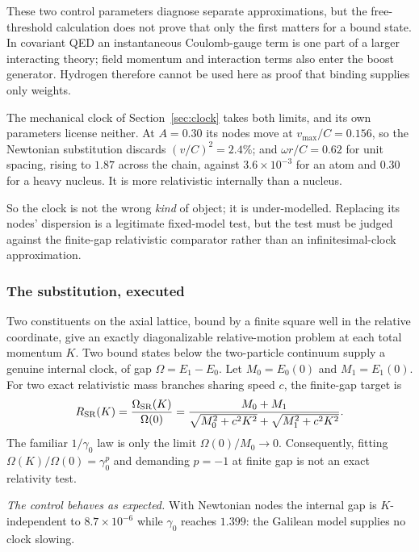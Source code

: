 \documentclass[11pt,a4paper]{article}
\theoremstyle{definition}
\theoremstyle{plain}
\theoremstyle{remark}
\begin{document}
These two control parameters diagnose separate approximations, but the
free-threshold calculation does not prove that only the first matters for a
bound state. In covariant QED an instantaneous Coulomb-gauge term is one
part of a larger interacting theory; field momentum and interaction terms
also enter the boost generator. Hydrogen therefore cannot be used here as
proof that binding supplies only weights.

The mechanical clock of Section~\ref{sec:clock} takes both limits, and its
own parameters license neither. At $A = 0.30$ its nodes move at
$v_{\max}/C = 0.156$, so the Newtonian substitution discards
$(v/C)^2 = 2.4\%$; and $\omega r/C = 0.62$ for unit spacing, rising to
$1.87$ across the chain, against $3.6\times10^{-3}$ for an atom and $0.30$
for a heavy nucleus. It is more relativistic internally than a nucleus.

So the clock is not the wrong \emph{kind} of object; it is under-modelled.
Replacing its nodes' dispersion is a legitimate fixed-model test, but the
test must be judged against the finite-gap relativistic comparator rather
than an infinitesimal-clock approximation.

\subsubsection{The substitution, executed}
\label{sec:substitution}

Two constituents on the axial lattice, bound by a finite square well in
the relative coordinate, give an exactly diagonalizable relative-motion
problem at each total momentum $K$. Two bound states below the
two-particle continuum supply a genuine internal clock, of gap
$\Omega = E_1-E_0$. Let $M_0=E_0(0)$ and $M_1=E_1(0)$. For two exact
relativistic mass branches sharing speed $c$, the finite-gap target is
\begin{equation}
R_{\rm SR}(K)=\frac{\Omega_{\rm SR}(K)}{\Omega(0)}
=\frac{M_0+M_1}
{\sqrt{M_0^2+c^2K^2}+\sqrt{M_1^2+c^2K^2}}.
\label{eq:finitegapsr}
\end{equation}
The familiar $1/\gamma_0$ law is only the limit
$\Omega(0)/M_0\to0$. Consequently, fitting
$\Omega(K)/\Omega(0)=\gamma_0^p$ and demanding $p=-1$ at finite gap is not
an exact relativity test.

\emph{The control behaves as expected.} With Newtonian
nodes the internal gap is $K$-independent to $8.7\times10^{-6}$ while
$\gamma_0$ reaches $1.399$: the Galilean model supplies no clock slowing.
\end{document}
